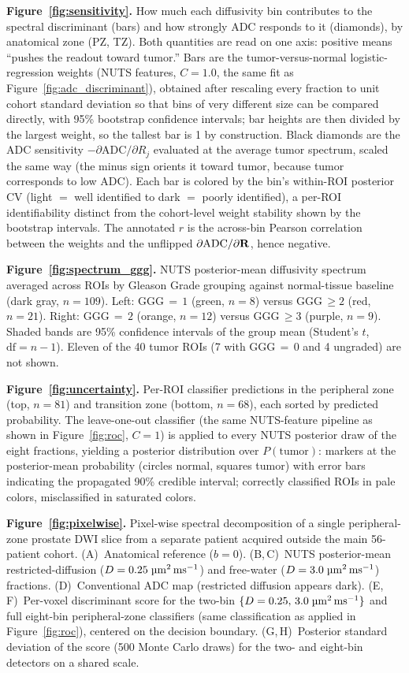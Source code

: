\medskip\noindent\textbf{Figure~\ref{fig:sensitivity}.}
How much each diffusivity bin contributes to the spectral discriminant (bars)
and how strongly ADC responds to it (diamonds), by anatomical zone (PZ, TZ).
Both quantities are read on one axis: positive means ``pushes the readout toward
tumor.''
Bars are the tumor-versus-normal logistic-regression weights (NUTS features,
$C = 1.0$, the same fit as Figure~\ref{fig:adc_discriminant}), obtained after
rescaling every fraction to unit cohort standard deviation so that bins of very
different size can be compared directly, with 95\% bootstrap confidence
intervals; bar heights are then divided by the largest weight, so the tallest
bar is 1 by construction.
Black diamonds are the ADC sensitivity $-\partial\text{ADC}/\partial R_j$
evaluated at the average tumor spectrum, scaled the same way (the minus sign
orients it toward tumor, because tumor corresponds to low ADC).
Each bar is colored by the bin's within-ROI posterior CV (light
$=$ well identified to dark $=$ poorly identified), a per-ROI identifiability
distinct from the cohort-level weight stability shown by the bootstrap
intervals.
The annotated $r$ is the across-bin Pearson correlation between the weights and
the unflipped $\partial\text{ADC}/\partial\mathbf{R}$, hence negative.

\medskip\noindent\textbf{Figure~\ref{fig:spectrum_ggg}.}
NUTS posterior-mean diffusivity spectrum averaged across ROIs by Gleason Grade
grouping against normal-tissue baseline (dark gray,
$n = 109$). Left: GGG\,$=\,1$ (green, $n = 8$) versus GGG\,$\geq 2$ (red,
$n = 21$). Right: GGG\,$=\,2$ (orange, $n = 12$) versus GGG\,$\geq 3$ (purple,
$n = 9$). Shaded bands are 95\% confidence intervals of the group mean
(Student's $t$, $\text{df} = n - 1$).
Eleven of the 40 tumor ROIs (7 with GGG\,$=\,0$ and 4 ungraded) are not shown.

\medskip\noindent\textbf{Figure~\ref{fig:uncertainty}.}
Per-ROI classifier predictions in the peripheral zone (top, $n = 81$) and
transition zone (bottom, $n = 68$), each sorted by predicted probability.
The leave-one-out classifier (the same NUTS-feature pipeline as shown in
Figure~\ref{fig:roc}, $C = 1$) is applied to every NUTS posterior draw of the
eight fractions, yielding a posterior distribution over $P(\mathrm{tumor})$:
markers at the posterior-mean probability (circles normal, squares tumor) with
error bars indicating the propagated 90\% credible interval; correctly classified ROIs in
pale colors, misclassified in saturated colors.

\medskip\noindent\textbf{Figure~\ref{fig:pixelwise}.}
Pixel-wise spectral decomposition of a single peripheral-zone prostate DWI
slice from a separate patient acquired outside the main 56-patient cohort.
(A)~Anatomical reference ($b = 0$).
(B,\,C)~NUTS posterior-mean restricted-diffusion ($D = 0.25\;\si{\micro\meter\squared\per\milli\second}$) and
free-water ($D = 3.0\;\si{\micro\meter\squared\per\milli\second}$) fractions.
(D)~Conventional ADC map (restricted diffusion appears dark).
(E,\,F)~Per-voxel discriminant score for the two-bin
$\{D = 0.25,\,3.0\;\si{\micro\meter\squared\per\milli\second}\}$ and full eight-bin peripheral-zone classifiers
(same classification as applied in Figure~\ref{fig:roc}), centered on the decision boundary.
(G,\,H)~Posterior standard deviation of the score (500 Monte Carlo draws) for
the two- and eight-bin detectors on a shared scale.
